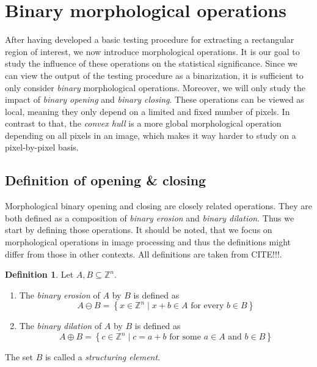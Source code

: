 \documentclass[a4paper,12pt]{article}
\theoremstyle{plain}
\theoremstyle{definition}
\newtheorem{definition}[theorem]{Definition}
\theoremstyle{remark}
\begin{document}
\newpage

\section{Binary morphological operations}

After having developed a basic testing procedure for extracting a rectangular region of interest, we now introduce morphological operations. It is our goal to study the influence of these operations on the statistical significance. Since we can view the output of the testing procedure as a binarization, it is sufficient to only consider \emph{binary} morphological operations. Moreover, we will only study the impact of \emph{binary opening} and \emph{binary closing}. These operations can be viewed as local, meaning they only depend on a limited and fixed number of pixels. In contrast to that, the \emph{convex hull} is a more global morphological operation depending on all pixels in an image, which makes it way harder to study on a pixel-by-pixel basis.

\subsection{Definition of opening \& closing}

Morphological binary opening and closing are closely related operations. They are both defined as a composition of \emph{binary erosion} and \emph{binary dilation}. Thus we start by defining those operations. It should be noted, that we focus on morphological operations in image processing and thus the definitions might differ from those in other contexts. All definitions are taken from CITE!!!.

\begin{definition}
	Let $A, B \subseteq \mathbb{Z}^n$.
	\begin{enumerate}
		\item The \emph{binary erosion} of $A$ by $B$ is defined as
		\begin{equation*}
			A \ominus B = \left\{ x \in \mathbb{Z}^n \mid x + b \in A \textrm{ for every } b \in B \right\}
		\end{equation*}
		\item The \emph{binary dilation} of $A$ by $B$ is defined as
		\begin{equation*}
			A \oplus B = \left\{ c \in \mathbb{Z}^n \mid c = a + b \textrm{ for some } a \in A \textrm{ and } b \in B \right\}
		\end{equation*}
	\end{enumerate}
	The set $B$ is called a \emph{structuring element}.
\end{definition}
\end{document}
